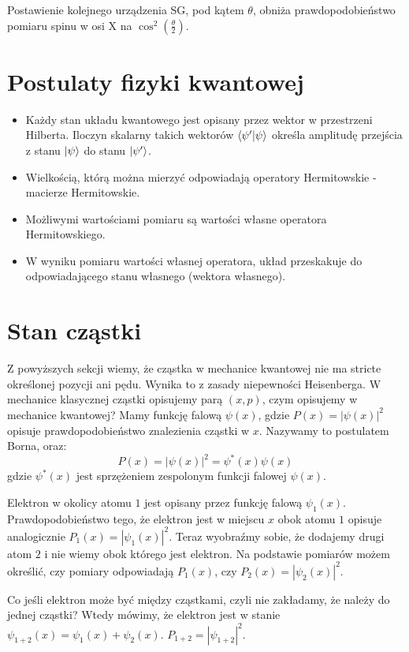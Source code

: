 \documentclass{../notatki}
\begin{document}
Postawienie kolejnego urządzenia SG, pod kątem $\theta$, obniża
prawdopodobieństwo
pomiaru spinu w osi X na $\cos^2(\frac{\theta}{2})$.

\section{Postulaty fizyki kwantowej}

\begin{itemize}
  \item Każdy stan układu kwantowego jest opisany przez wektor w
    przestrzeni Hilberta.
    Iloczyn skalarny takich wektorów $\braket{\psi'}{\psi}$ określa amplitudę
    przejścia z stanu $\ket{\psi}$ do stanu $\ket{\psi'}$.
  \item Wielkością, którą można mierzyć odpowiadają operatory
    Hermitowskie - macierze Hermitowskie.
  \item Możliwymi wartościami pomiaru są wartości własne operatora
    Hermitowskiego.
  \item W wyniku pomiaru wartości własnej operatora, układ przeskakuje do
    odpowiadającego stanu własnego (wektora własnego).
\end{itemize}

\section{Stan cząstki}

Z powyższych sekcji wiemy, że cząstka w mechanice kwantowej nie ma stricte
określonej pozycji ani pędu. Wynika to z zasady niepewności Heisenberga.
W mechanice klasycznej cząstki opisujemy parą $(x, p)$, czym opisujemy w
mechanice kwantowej? Mamy funkcję falową $\psi(x)$, gdzie $P(x) = |\psi(x)|^2$
opisuje prawdopodobieństwo znalezienia cząstki w $x$. Nazywamy to postulatem
Borna, oraz:
$$
P(x) = |\psi(x)|^2 = \psi^*(x)\psi(x)
$$
gdzie $\psi^*(x)$ jest sprzężeniem zespolonym funkcji falowej $\psi(x)$.

Elektron w okolicy atomu $1$ jest opisany przez funkcję falową $\psi_1(x)$.
Prawdopodobieństwo tego, że elektron jest w miejscu $x$ obok atomu $1$ opisuje
analogicznie $P_1(x) = |\psi_1(x)|^2$. Teraz wyobraźmy sobie, że
dodajemy drugi atom $2$ i nie wiemy obok
którego jest elektron. Na podstawie pomiarów możem określić, czy pomiary
odpowiadają $P_1(x)$, czy $P_2(x) = |\psi_2(x)|^2$.

Co jeśli elektron może być między cząstkami, czyli nie zakładamy, że należy
do jednej cząstki? Wtedy mówimy, że elektron jest w stanie $\psi_{1 +
2}(x) = \psi_1(x) + \psi_2(x)$. $P_{1 + 2} = |\psi_{1 + 2}|^2$.
\end{document}
